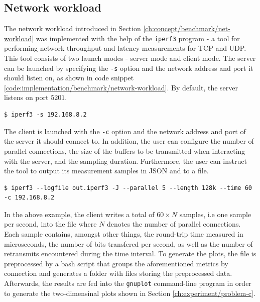 \subsection{Network workload}
The network workload introduced in Section \ref{ch:concept/benchmark/net-workload} 
was implemented with the help of the \verb|iperf3| program - a tool 
for performing network throughput and latency measurements for TCP and UDP.
This tool consists of two launch modes - server mode and client mode. 
The server can be launched by specifying the \verb|-s| option and the 
network address and port it should listen on, as shown in code snippet \ref{code:implementation/benchmark/network-workload}. 
By default, the server listens on port $5201$. 
\begin{lstlisting}[label={code:implementation/benchmark/network-workload}, style=bash, caption={Launching an iperf3 TCP server}]
$ iperf3 -s 192.168.8.2
\end{lstlisting}
The client is launched with the \verb|-c| option and the network address and port 
of the server it should connect to. In addition, the user can configure the 
number of parallel connections, the size of the buffers to be transmitted 
when interacting with the server, and the sampling duration. Furthermore,
the user can instruct the tool to output its measurement samples in JSON and to a file.
\begin{lstlisting}[label={code:implementation/benchmark/network-workload}, style=bash, caption={Launching an iperf3 TCP client that connects to an iperf3 server listening on 192.168.8.2 and writes performance samples gathered for 60 seconds from 5 parallel connections into a file}]
$ iperf3 --logfile out.iperf3 -J --parallel 5 --length 128k --time 60 -c 192.168.8.2
\end{lstlisting}
In the above example, the client writes a total of $60 \times N$ samples, i.e one sample per second, into the file where $N$ denotes the number of 
parallel connections. Each sample contains, amongst other things, the round-trip time measured in microseconds, the 
number of bits transfered per second, as well as the number of retransmits encountered during the time interval. 
To generate the plots, the file is preprocessed by a bash script that groups the aforementioned metrics
by connection and generates a folder with files storing the preprocessed data. Afterwards, the results are fed into the 
\verb|gnuplot| command-line program in order to generate the two-dimensinal plots shown in Section \ref{ch:experiment/problem-c}.

